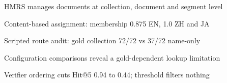 \begin{highlights}
\item HMRS manages documents at collection, document and segment level
\item Content-based assignment: membership 0.875 EN, 1.0 ZH and JA
\item Scripted route audit: gold collection 72/72 vs 37/72 name-only
\item Configuration comparisons reveal a gold-dependent lookup limitation
\item Verifier ordering cuts Hit@5 0.94 to 0.44; threshold filters nothing
\end{highlights}
